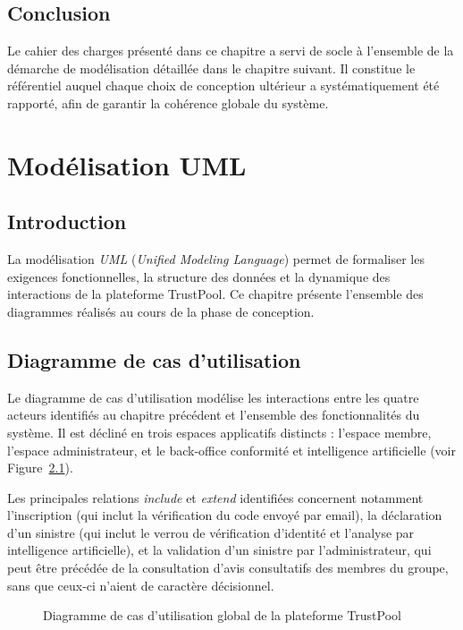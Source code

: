 \documentclass[12pt,a4paper]{report}
\begin{document}
\section{Conclusion}
Le cahier des charges présenté dans ce chapitre a servi de socle à l'ensemble de la démarche de modélisation détaillée dans le chapitre suivant. Il constitue le référentiel auquel chaque choix de conception ultérieur a systématiquement été rapporté, afin de garantir la cohérence globale du système.

\newpage

\chapter{Modélisation UML}

\section{Introduction}
La modélisation \textit{UML} (\textit{Unified Modeling Language}) permet de formaliser les exigences fonctionnelles, la structure des données et la dynamique des interactions de la plateforme TrustPool. Ce chapitre présente l'ensemble des diagrammes réalisés au cours de la phase de conception.

\section{Diagramme de cas d'utilisation}
Le diagramme de cas d'utilisation modélise les interactions entre les quatre acteurs identifiés au chapitre précédent et l'ensemble des fonctionnalités du système. Il est décliné en trois espaces applicatifs distincts : l'espace membre, l'espace administrateur, et le back-office conformité et intelligence artificielle (voir Figure~\ref{fig:use-case}).

Les principales relations \textit{include} et \textit{extend} identifiées concernent notamment l'inscription (qui inclut la vérification du code envoyé par email), la déclaration d'un sinistre (qui inclut le verrou de vérification d'identité et l'analyse par intelligence artificielle), et la validation d'un sinistre par l'administrateur, qui peut être précédée de la consultation d'avis consultatifs des membres du groupe, sans que ceux-ci n'aient de caractère décisionnel.

\begin{figure}[H]
    \centering
    \caption{Diagramme de cas d'utilisation global de la plateforme TrustPool}
    \label{fig:use-case}
\end{figure}
\end{document}
